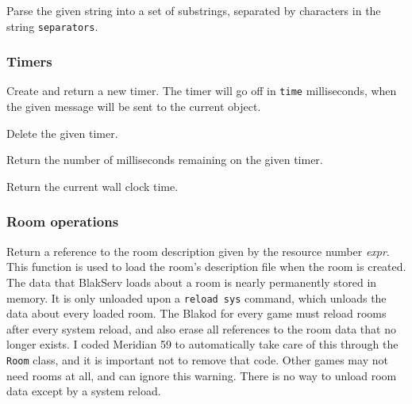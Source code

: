 \begin{leftlines}
\end{leftlines}

Parse the given string into a set of substrings, separated by
characters in the string {\tt separators}.

\subsubsection{Timers}

\begin{leftlines}
\end{leftlines}

Create and return a new timer.  The timer will go off in {\tt time}
milliseconds, when the given message will be sent to the current object.

\begin{leftlines}
\end{leftlines}

Delete the given timer.

\begin{leftlines}
\end{leftlines}

Return the number of milliseconds remaining on the given timer.

\begin{leftlines}
\end{leftlines}

Return the current wall clock time.

\subsubsection{Room operations}

\begin{leftlines}
\end{leftlines}

Return a reference to the room description given by the resource
number {\em expr}.  This function is used to load the room's
description file when the room is created.  The data that BlakServ loads
about a room is nearly permanently stored in memory.  It is only unloaded
upon a {\tt reload sys} command, which unloads the data about every loaded
room.  The Blakod for every game must reload rooms after every system
reload, and also erase all references to the room data that no longer
exists.  I coded Meridian 59 to automatically take care of this through
the {\tt Room} class, and it is important not to remove that code.  Other
games may not need rooms at all, and can ignore this warning.  There is no
way to unload room data except by a system reload.

